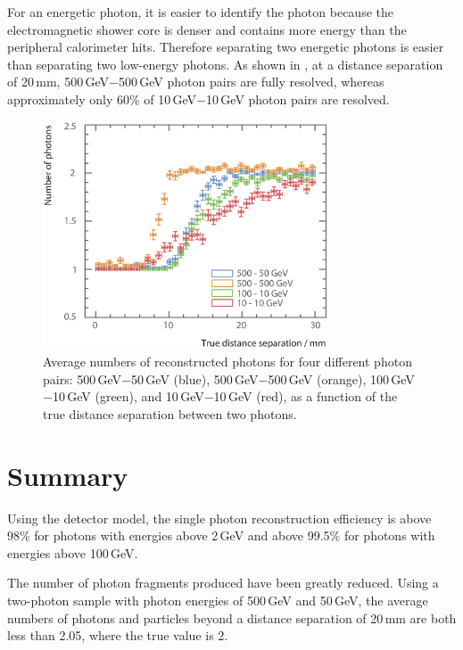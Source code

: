 For an energetic photon, it is easier to identify the photon because the electromagnetic shower core is denser and contains more energy than the peripheral calorimeter hits. Therefore separating two energetic photons is easier than separating two low-energy photons. As shown in , at a distance separation of 20\,mm, 500\,GeV$-$500\,GeV photon pairs are fully resolved, whereas approximately only 60\% of 10\,GeV$-$10\,GeV photon pairs are resolved.

\begin{figure}[tbph]
\centering
        \includegraphics[width=0.75\textwidth]{photon/DoubleCompareEnergies2}
        \caption{Average numbers of reconstructed photons for four different photon pairs: 500\,GeV$-$50\,GeV (blue), 500\,GeV$-$500\,GeV (orange), 100\,GeV$-$10\,GeV (green), and 10\,GeV$-$10\,GeV (red), as a function of the true distance separation between two photons.}
        \label{fig:photonDoubleCompareEnergies}
\end{figure}

\section{Summary}

Using the \ILD detector model, the single photon reconstruction efficiency is above 98\% for photons with energies above 2\,GeV and above 99.5\% for photons with energies above 100\,GeV.

The number of photon fragments produced have been greatly reduced. Using a two-photon sample with photon energies of  500\,GeV and 50\,GeV, the average numbers of photons and particles beyond a distance separation of 20\,mm  are both less than 2.05, where the true value is 2.

